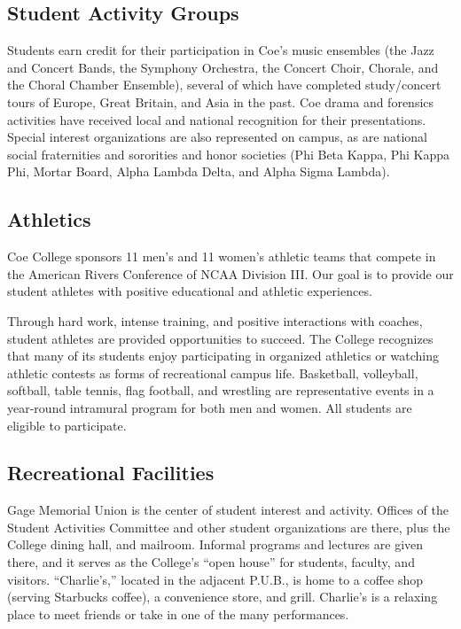 \documentclass[
  letterpaper,
]{scrbook}
\begin{document}
\subsection{Student Activity Groups}\label{student-activity-groups}

Students earn credit for their participation in Coe's music ensembles
(the Jazz and Concert Bands, the Symphony Orchestra, the Concert Choir,
Chorale, and the Choral Chamber Ensemble), several of which have
completed study/concert tours of Europe, Great Britain, and Asia in the
past. Coe drama and forensics activities have received local and
national recognition for their presentations. Special interest
organizations are also represented on campus, as are national social
fraternities and sororities and honor societies (Phi Beta Kappa, Phi
Kappa Phi, Mortar Board, Alpha Lambda Delta, and Alpha Sigma Lambda).

\subsection{Athletics}\label{athletics}

Coe College sponsors 11 men's and 11 women's athletic teams that compete
in the American Rivers Conference of NCAA Division III. Our goal is to
provide our student athletes with positive educational and athletic
experiences.

Through hard work, intense training, and positive interactions with
coaches, student athletes are provided opportunities to succeed. The
College recognizes that many of its students enjoy participating in
organized athletics or watching athletic contests as forms of
recreational campus life. Basketball, volleyball, softball, table
tennis, flag football, and wrestling are representative events in a
year-round intramural program for both men and women. All students are
eligible to participate.

\subsection{Recreational Facilities}\label{recreational-facilities}

Gage Memorial Union is the center of student interest and activity.
Offices of the Student Activities Committee and other student
organizations are there, plus the College dining hall, and mailroom.
Informal programs and lectures are given there, and it serves as the
College's ``open house'' for students, faculty, and visitors.
``Charlie's,'' located in the adjacent P.U.B., is home to a coffee shop
(serving Starbucks coffee), a convenience store, and grill. Charlie's is
a relaxing place to meet friends or take in one of the many
performances.
\end{document}
